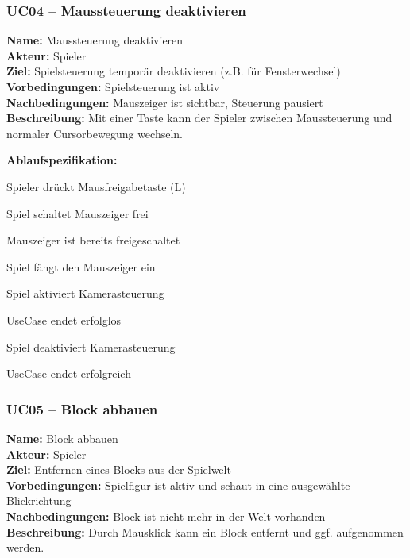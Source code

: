 \documentclass{article}
\begin{document}
\newpage

\subsubsection*{UC04 – Maussteuerung deaktivieren}

\textbf{Name:} Maussteuerung deaktivieren \\
\textbf{Akteur:} Spieler \\
\textbf{Ziel:} Spielsteuerung temporär deaktivieren (z.B. für Fensterwechsel) \\
\textbf{Vorbedingungen:} Spielsteuerung ist aktiv \\
\textbf{Nachbedingungen:} Mauszeiger ist sichtbar, Steuerung pausiert \\
\textbf{Beschreibung:} Mit einer Taste kann der Spieler zwischen Maussteuerung und normaler Cursorbewegung wechseln.

\textbf{Ablaufspezifikation:}
\begin{description}[style=nextline,leftmargin=1.9cm,labelwidth=1.6cm]
  \item[1.] Spieler drückt Mausfreigabetaste (L)
  \item[2.] Spiel schaltet Mauszeiger frei
  \item[2a.] Mauszeiger ist bereits freigeschaltet
  \item[2a.1.] Spiel fängt den Mauszeiger ein
  \item[2a.2.] Spiel aktiviert Kamerasteuerung
  \item[2a.3.] UseCase endet erfolglos
  \item[3.] Spiel deaktiviert Kamerasteuerung
  \item[4.] UseCase endet erfolgreich
\end{description}

\newpage

\subsubsection*{UC05 – Block abbauen}

\textbf{Name:} Block abbauen \\
\textbf{Akteur:} Spieler \\
\textbf{Ziel:} Entfernen eines Blocks aus der Spielwelt \\
\textbf{Vorbedingungen:} Spielfigur ist aktiv und schaut in eine ausgewählte Blickrichtung \\
\textbf{Nachbedingungen:} Block ist nicht mehr in der Welt vorhanden \\
\textbf{Beschreibung:} Durch Mausklick kann ein Block entfernt und ggf. aufgenommen werden.
\end{document}
